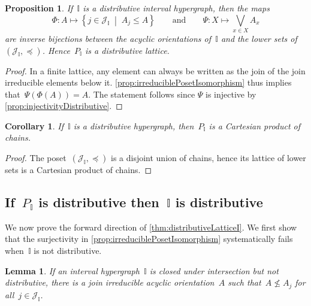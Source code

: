 \documentclass{amsart}
\newtheorem{corollary}[theorem]{Corollary}
\newtheorem{proposition}[theorem]{Proposition}
\newtheorem{lemma}[theorem]{Lemma}
\theoremstyle{definition}
\newcommand{\cal}[1]{\mathcal{#1}} %
\newcommand{\set}[2]{\left\{ #1 \;\middle|\; #2 \right\}} %
\newcommand{\bigJoin}{\bigvee} %
\newcommand{\II}{\mathbb I} %
\newcommand{\cJ}{\cal{J}} %
\begin{document}
\begin{proposition}
\label{prop:distributiveForwardI}
If~$\II$ is a distributive interval hypergraph, then the maps
\[
\Phi : A \mapsto \set{j \in \cJ_\II}{A_j \le A}
\qquad\text{and}\qquad
\Psi : X \mapsto \bigJoin_{x \in X} A_x
\]
are inverse bijections between the acyclic orientations of~$\II$ and the lower sets of~$(\cJ_\II, \preccurlyeq)$. Hence~$P_\II$ is a distributive lattice.
\end{proposition}

\begin{proof}
In a finite lattice, any element can always be written as the join of the join irreducible elements below it.
\cref{prop:irreduciblePosetIsomorphism} thus implies that~$\Psi(\Phi(A)) = A$.
The statement follows since $\Psi$ is injective by \cref{prop:injectivityDistributive}.
\end{proof}

\begin{corollary}
If~$\II$ is a distributive hypergraph, then~$P_\II$ is a Cartesian product of chains.
\end{corollary}

\begin{proof}
The poset~$(\cJ_\II, \preccurlyeq)$ is a disjoint union of chains, hence its lattice of lower sets is a Cartesian product of chains.
\end{proof}


\subsection{If~$P_\II$ is distributive then~$\II$ is distributive}
\label{subsec:distributiveLatticeForward}

We now prove the forward direction of \cref{thm:distributiveLatticeI}.
We first show that the surjectivity in \cref{prop:irreduciblePosetIsomorphism} systematically fails when~$\II$ is not distributive.

\begin{lemma}
\label{lem:oneMoreIrreducible}
If an interval hypergraph~$\II$ is closed under intersection but not distributive, there is a join irreducible acyclic orientation~$A$ such that~$A \not\le A_j$ for all~$j \in \cJ_\II$.
\end{lemma}
\end{document}
